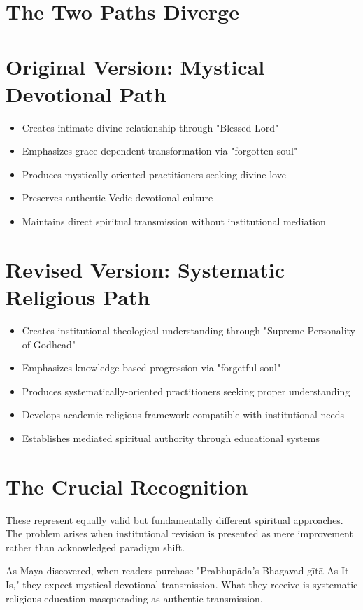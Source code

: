 \documentclass[11pt,twoside]{book}
\begin{document}
\section*{The Two Paths Diverge}
\label{sec:org9b9ee7b}

\section*{Original Version: Mystical Devotional Path}
\label{sec:orga78e1b8}
\begin{itemize}
\item Creates intimate divine relationship through "Blessed Lord"
\item Emphasizes grace-dependent transformation via "forgotten soul"
\item Produces mystically-oriented practitioners seeking divine love
\item Preserves authentic Vedic devotional culture
\item Maintains direct spiritual transmission without institutional mediation
\end{itemize}
\section*{Revised Version: Systematic Religious Path}
\label{sec:org334586c}
\begin{itemize}
\item Creates institutional theological understanding through "Supreme Personality of Godhead"
\item Emphasizes knowledge-based progression via "forgetful soul"
\item Produces systematically-oriented practitioners seeking proper understanding
\item Develops academic religious framework compatible with institutional needs
\item Establishes mediated spiritual authority through educational systems
\end{itemize}
\section*{The Crucial Recognition}
\label{sec:org900c54f}

These represent equally valid but fundamentally different spiritual approaches. The problem arises when institutional revision is presented as mere improvement rather than acknowledged paradigm shift.

As Maya discovered, when readers purchase "Prabhupāda's Bhagavad-gītā As It Is," they expect mystical devotional transmission. What they receive is systematic religious education masquerading as authentic transmission.
\end{document}
